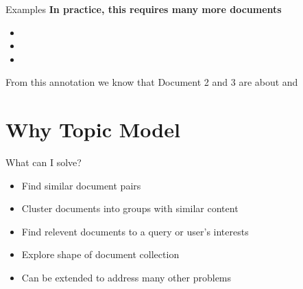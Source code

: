 \documentclass[10pt]{beamer}
\begin{document}
\begin{frame}{Examples}
{\bf In practice, this requires many more documents}

  \begin{multicols}{2}


    \vspace{.25em}


    \vspace{.25em}


    \columnbreak

    \begin{itemize}
    \item {}
    \item {}
    \item {}
    \end{itemize}

    \vspace{1em}

    From this annotation we know that Document 2 and 3 are about  and 
  \end{multicols}

\end{frame}

\section{Why Topic Model}

\begin{frame}{What can I solve?}
  \begin{itemize}
  \item Find similar document pairs
  \item Cluster documents into groups with similar content
  \item Find relevent documents to a query or user's interests
  \item Explore shape of document collection
  \item Can be extended to address many other problems
  \end{itemize}
\end{frame}
\end{document}
